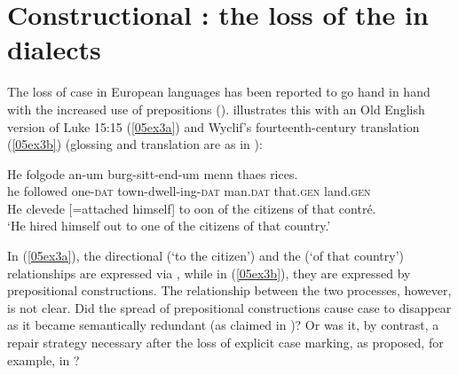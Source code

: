 \documentclass[output=paper,colorlinks,citecolor=brown]{langscibook}
\begin{document}
\section{Constructional : the loss of the  in  dialects} \label{05sec3}

\largerpage[1]

The loss of case in European languages has been reported to go hand in hand with the increased use of prepositions (\citealt{blake2004, hewsonbubenik2006, kulikov2006}). \citet[178]{blake2004} illustrates this with an Old English version of Luke 15:15 (\ref{05ex3a}) and Wyclif's fourteenth-century translation (\ref{05ex3b}) (glossing and translation are as in \citealt{blake2004}):

\begin{exe}
	\ex
	\begin{xlist}
		\ex \label{05ex3a}
		\gll He folgode an-um burg-sitt-end-um menn thaes rices. \\
		he followed one-\textsc{dat} town-dwell-ing-\textsc{dat} man.\textsc{dat} that.\textsc{gen} land.\textsc{gen} \\
		\ex \label{05ex3b}
		He clevede [=attached himself] to oon of the citizens of that contré. \\
		\trans ‘He hired himself out to one of the citizens of that country.’
	\end{xlist}
\end{exe}

In (\ref{05ex3a}), the directional (`to the citizen') and the  (`of that country') relationships are expressed via , while in (\ref{05ex3b}), they are expressed by prepositional constructions. The relationship between the two processes, however, is not clear. Did the spread of prepositional constructions cause case to disappear as it became semantically redundant (as claimed in \citealt{hjelmslev1935, hewsonbubenik2006})? Or was it, by contrast, a repair strategy necessary after the loss of explicit case marking, as proposed, for example, in \citet{skautrup1944}?
\end{document}
